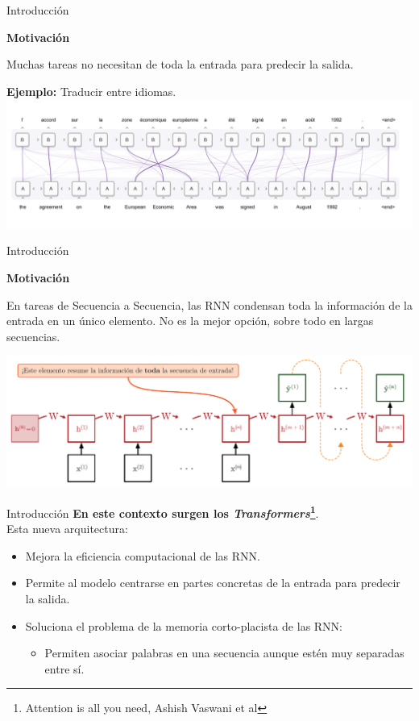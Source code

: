 \documentclass[aspectratio=169]{beamer}
\newenvironment{blockm}[1]{%
  \begin{block}{\textbf{#1}}%
  }{%
  \end{block}%
  \vspace{1em}%
}
\begin{document}
\begin{frame}{Introducción}
  \begin{blockm}{Motivación}
    Muchas tareas no necesitan de toda la entrada para predecir la salida.
  \end{blockm}
  \textbf{Ejemplo:} Traducir entre idiomas.
  \includegraphics[width=\textwidth, center]{imgs/tema4/att/EX3.png}
\end{frame}

\begin{frame}{Introducción}
  \begin{blockm}{Motivación}
    En tareas de Secuencia a Secuencia, las RNN condensan toda la información de la entrada en un único elemento. No es la mejor opción, sobre todo en largas secuencias. 
  \end{blockm}
  \includegraphics[width=.95\textwidth, center]{imgs/tema4/att/Seq2Seq RNN.pdf}
\end{frame}

\begin{frame}{Introducción}
  \textbf{En este contexto surgen los \emph{Transformers}\footnote{Attention is all you need, Ashish Vaswani et al}}.\\
  \vspace{.5cm}
  Esta nueva arquitectura:
  \begin{itemize}
    \item Mejora la eficiencia computacional de las RNN.
    \item Permite al modelo centrarse en partes concretas de la entrada para predecir la salida.
    \item Soluciona el problema de la memoria corto-placista de las RNN:
    \begin{itemize}
      \item Permiten asociar palabras en una secuencia aunque estén muy separadas entre sí.
    \end{itemize}
  \end{itemize}

\end{frame}
\end{document}

